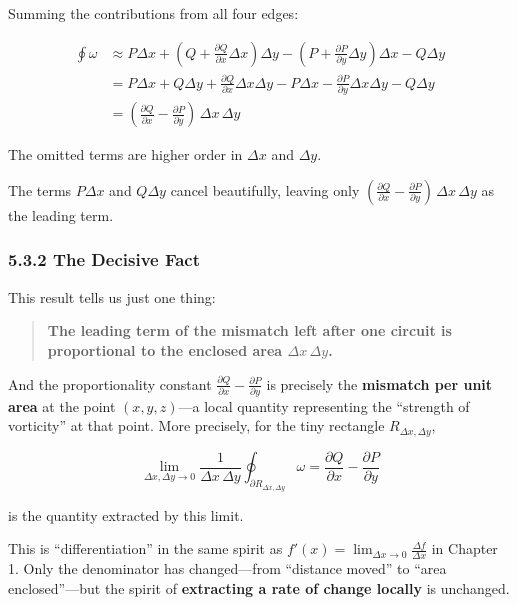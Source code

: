 \documentclass[a4paper,12pt,openany]{book}
\begin{document}
Summing the contributions from all four edges:

\[\begin{aligned}
\oint \omega &\approx P\Delta x + (Q + \frac{\partial Q}{\partial x}\Delta x)\Delta y - (P + \frac{\partial P}{\partial y}\Delta y)\Delta x - Q\Delta y \\
&= P\Delta x + Q\Delta y + \frac{\partial Q}{\partial x}\Delta x\Delta y - P\Delta x - \frac{\partial P}{\partial y}\Delta x\Delta y - Q\Delta y \\
&= (\frac{\partial Q}{\partial x} - \frac{\partial P}{\partial y})\,\Delta x\,\Delta y
\end{aligned}\]

The omitted terms are higher order in \(\Delta x\) and \(\Delta y\).

The terms \(P\Delta x\) and \(Q\Delta y\) cancel beautifully, leaving
only
\((\frac{\partial Q}{\partial x} - \frac{\partial P}{\partial y})\,\Delta x\,\Delta y\)
as the leading term.

\hypertarget{the-decisive-fact}{%
\subsubsection{5.3.2 The Decisive Fact}\label{the-decisive-fact}}

This result tells us just one thing:

\begin{quote}
\textbf{The leading term of the mismatch left after one circuit is proportional to the enclosed area $\Delta x\,\Delta y$.}
\end{quote}

And the proportionality constant
\(\frac{\partial Q}{\partial x} - \frac{\partial P}{\partial y}\) is
precisely the \textbf{mismatch per unit area} at the point
\((x,y,z)\)—a local quantity representing the ``strength of
vorticity'' at that point. More precisely, for the tiny rectangle
\(R_{\Delta x,\Delta y}\),

\[\lim_{\Delta x,\Delta y\to 0}\frac{1}{\Delta x\,\Delta y}\oint_{\partial R_{\Delta x,\Delta y}}\omega = \frac{\partial Q}{\partial x} - \frac{\partial P}{\partial y}\]

is the quantity extracted by this limit.

This is ``differentiation'' in the same spirit as
\(f'(x) = \lim_{\Delta x\to 0} \frac{\Delta f}{\Delta x}\) in Chapter 1.
Only the denominator has changed—from ``distance moved'' to ``area
enclosed''—but the spirit of
\textbf{extracting a rate of change locally} is unchanged.
\end{document}
